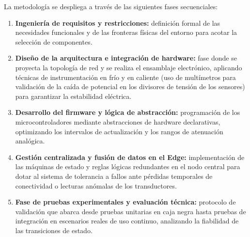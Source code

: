 La metodología se despliega a través de las siguientes fases secuenciales:
\begin{enumerate}
    \item \textbf{Ingeniería de requisitos y restricciones:} definición formal de las necesidades funcionales y de las fronteras físicas del entorno para acotar la selección de componentes.
    \item \textbf{Diseño de la arquitectura e integración de hardware:} fase donde se proyecta la topología de red y se realiza el ensamblaje electrónico, aplicando técnicas de instrumentación en frío y en caliente (uso de multímetros para validación de la caída de potencial en los divisores de tensión de los sensores) para garantizar la estabilidad eléctrica.
    \item \textbf{Desarrollo del firmware y lógica de abstracción:} programación de los microcontroladores mediante abstracciones de hardware declarativas, optimizando los intervalos de actualización y los rangos de atenuación analógica.
    \item \textbf{Gestión centralizada y fusión de datos en el Edge:} implementación de las máquinas de estado y reglas lógicas redundantes en el nodo central para dotar al sistema de tolerancia a fallos ante pérdidas temporales de conectividad o lecturas anómalas de los transductores.
    \item \textbf{Fase de pruebas experimentales y evaluación técnica:} protocolo de validación que abarca desde pruebas unitarias en caja negra hasta pruebas de integración en escenarios reales de uso continuo, analizando la fiabilidad de las transiciones de estado.
\end{enumerate}

